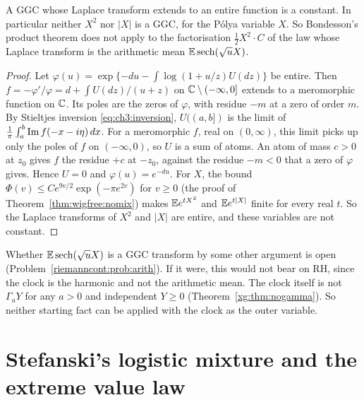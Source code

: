 \begin{proposition}\label{riemanncont:prop:entire}
A GGC whose Laplace transform extends to an entire function is a constant. In particular neither $X^2$ nor $|X|$ is a GGC, for the P\'olya variable $X$. So Bondesson's product theorem does not apply to the factorisation $\frac12X^2\cdot C$ of the law whose Laplace transform is the arithmetic mean $\mathbb{E}\operatorname{sech}(\sqrt uX)$.
\end{proposition}

\begin{proof}
Let $\varphi(u)=\exp\{-du-\int\log(1+u/z)U(dz)\}$ be entire. Then $f=-\varphi'/\varphi=d+\int U(dz)/(u+z)$ on $\mathbb{C}\setminus(-\infty,0]$ extends to a meromorphic function on $\mathbb{C}$. Its poles are the zeros of $\varphi$, with residue $-m$ at a zero of order $m$. By Stieltjes inversion \eqref{eq:ch3:inversion}, $U((a,b])$ is the limit of $\frac1\pi\int_a^b\operatorname{Im} f(-x-i\eta)\,dx$. For a meromorphic $f$, real on $(0,\infty)$, this limit picks up only the poles of $f$ on $(-\infty,0)$, so $U$ is a sum of atoms. An atom of mass $c>0$ at $z_0$ gives $f$ the residue $+c$ at $-z_0$, against the residue $-m<0$ that a zero of $\varphi$ gives. Hence $U=0$ and $\varphi(u)=e^{-du}$. For $X$, the bound $\Phi(v)\le Ce^{9v/2}\exp(-\pi e^{2v})$ for $v\ge0$ (the proof of Theorem~\ref{thm:wigfree:nomix}) makes $\mathbb{E} e^{tX^2}$ and $\mathbb{E} e^{t|X|}$ finite for every real $t$. So the Laplace transforms of $X^2$ and $|X|$ are entire, and these variables are not constant.
\end{proof}

Whether $\mathbb{E}\operatorname{sech}(\sqrt uX)$ is a GGC transform by some other argument is open (Problem~\ref{riemanncont:prob:arith}). If it were, this would not bear on RH, since the clock is the harmonic and not the arithmetic mean. The clock itself is not $\Gamma_aY$ for any $a>0$ and independent $Y\ge0$ (Theorem~\ref{xg:thm:nogamma}). So neither starting fact can be applied with the clock as the outer variable.

\section{Stefanski's logistic mixture and the extreme value law}\label{riemanncont:sec:logistic}

